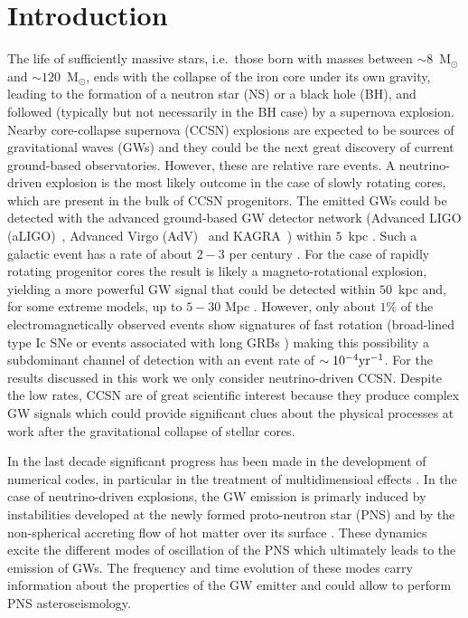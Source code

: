 
\section{Introduction}


The life of sufficiently massive stars, i.e.~those born with masses between $\sim 8$~M$_\odot$ and $\sim 120$~M$_\odot$, ends with the collapse of {the} iron core under {its} own gravity, leading {to} the formation of a neutron star {(NS)} or a black hole (BH), {and} followed (typically but not necessarily in the BH case) by {a supernova} explosion. Nearby core-collapse supernova (CCSN) explosions are expected to be sources of gravitational waves (GWs) and they could be 
the next great discovery of current ground-based observatories. However, these are relative rare events. A neutrino-driven explosion \citep{Bethe:1990} is the most likely outcome in the case of slowly rotating cores, which are present in the bulk of CCSN progenitors. The emitted GWs could be detected with the advanced ground-based GW detector network (Advanced LIGO (aLIGO)~\citep{TheLIGOScientific:2014jea}, Advanced Virgo (AdV)~\citep{TheVirgo:2014hva} and
KAGRA~\citep{Aso:2013eba}) within $5$~kpc \citep{Gossan:2016,TargetedSNSearchO12}. Such a galactic event has a rate of about $2-3$ per century \citep{Adams:2013,Rozwadowska:2021}.
For the case of rapidly rotating progenitor cores the result is likely a magneto-rotational explosion, yielding  a more powerful GW signal that could be detected within $50$~kpc and, for some extreme models, up to $5-30$ Mpc \citep{Gossan:2016,TargetedSNSearchO12}. However, only about $1\%$ of the electromagnetically observed events show signatures of fast rotation (broad-lined type Ic SNe \citep{Li:2011b} or events associated with long GRBs 
\citep{Chapman:2007}) making this possibility a subdominant channel of detection with an event rate of $\sim 10^{-4} \rm{yr}^{-1}$. For the results discussed in this work we only consider neutrino-driven CCSN.  Despite the low rates, CCSN are of great scientific interest because they produce complex GW signals which could provide significant clues about the physical processes at work after the gravitational collapse of stellar cores. 

In the last decade significant progress has been made in the development of numerical codes, {in particular in the treatment of multidimensioal effects \citep{BMueller:2020}.} In the case of  neutrino-driven explosions, the GW emission is {primarly induced by instabilities developed at the newly formed proto-neutron star (PNS) and by the non-spherical accreting flow of hot matter over its surface \citep{Kotake:2017}.  These} dynamics excite the different modes of oscillation of the PNS which ultimately leads to the emission of GWs. The frequency and time evolution of these modes carry information about the properties of the GW emitter and could allow to perform PNS asteroseismology. 


